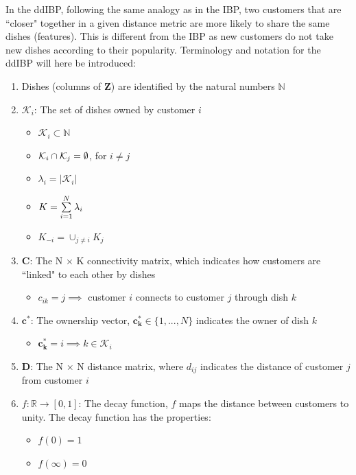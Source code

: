 \noindent
In the ddIBP, following the same analogy as in the IBP, two customers that are
``closer" together in a given distance metric are more likely to share the same
dishes (features). This is different from the IBP as new customers do not take
new dishes according to their popularity. Terminology and notation for the ddIBP
will here be introduced:

\begin{enumerate}
  \item Dishes (columns of $\bm Z$) are identified by the natural numbers 
        $\mathbb{N}$

  \item $\mathcal{K}_i$: The set of dishes owned by customer $i$
  \begin{itemize}
    \item $\mathcal{K}_i \subset \mathbb{N}$
    \item $\mathcal{K}_i \cap \mathcal{K}_j = \emptyset$, for $i \ne j$
    \item $\lambda_i = |\mathcal{K}_i|$
    \item $K = \sum\limits_{i=1}^{N} \lambda_i$ 
    \item $K_{-i} = \cup_{j \ne i}K_j$
  \end{itemize}

  \item $\bm C$: The N $\times $ K connectivity matrix, which indicates how 
                 customers are ``linked" to each other by dishes
  \begin{itemize}
    \item $c_{ik} = j \implies$ customer $i$ connects to customer $j$ through
          dish $k$
  \end{itemize}

  \item $\bm{c^*}$: The ownership vector, $\bm{c_k^*} \in \{1,...,N\}$ indicates
                   the owner of dish $k$
  \begin{itemize}
    \item $\bm{c_k^*}=i \implies k \in \mathcal{K}_i$
  \end{itemize}

  \item $\bm D$: The N $\times$ N distance matrix, where $d_{ij}$ indicates the 
                 distance of customer $j$ from customer $i$
  
  \item $f: \mathbb{R} \rightarrow [0,1]$: The decay function, $f$ maps the 
                                           distance between customers to unity.
                                           The decay function has the properties:
                                           \begin{itemize}
                                             \item $f(0) = 1$
                                             \item $f(\infty) = 0$
                                           \end{itemize}


\end{enumerate}
